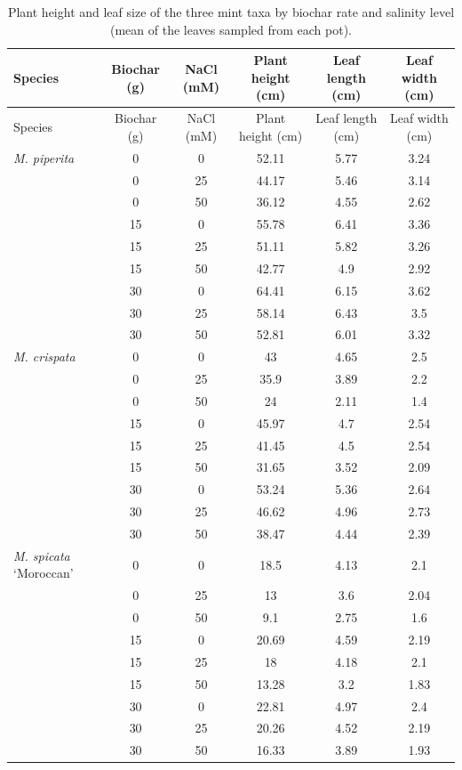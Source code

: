 {
\small
\begin{longtable}{p{3cm}cc S[table-format=2.2,round-mode=places,round-precision=2] S[table-format=1.2,round-mode=places,round-precision=2] S[table-format=1.2,round-mode=places,round-precision=2]}
  \caption[Plant height and leaf size]{Plant height and leaf size of the three mint taxa by biochar rate and salinity level (mean of the leaves sampled from each pot).} \label{tab:growth} \\
  \toprule
  Species & Biochar (g) & NaCl (mM) & {Plant height (cm)} & {Leaf length (cm)} & {Leaf width (cm)} \\
  \midrule
  \endfirsthead
  \toprule
  Species & Biochar (g) & NaCl (mM) & {Plant height (cm)} & {Leaf length (cm)} & {Leaf width (cm)} \\
  \midrule
  \endhead
  \bottomrule
  \endlastfoot
  \textit{M. piperita} & 0 & 0 & 52.11 & 5.77 & 3.24 \\
   & 0 & 25 & 44.17 & 5.46 & 3.14 \\
   & 0 & 50 & 36.12 & 4.55 & 2.62 \\
   & 15 & 0 & 55.78 & 6.41 & 3.36 \\
   & 15 & 25 & 51.11 & 5.82 & 3.26 \\
   & 15 & 50 & 42.77 & 4.9 & 2.92 \\
   & 30 & 0 & 64.41 & 6.15 & 3.62 \\
   & 30 & 25 & 58.14 & 6.43 & 3.5 \\
   & 30 & 50 & 52.81 & 6.01 & 3.32 \\
  \midrule
  \textit{M. crispata} & 0 & 0 & 43 & 4.65 & 2.5 \\
   & 0 & 25 & 35.9 & 3.89 & 2.2 \\
   & 0 & 50 & 24 & 2.11 & 1.4 \\
   & 15 & 0 & 45.97 & 4.7 & 2.54 \\
   & 15 & 25 & 41.45 & 4.5 & 2.54 \\
   & 15 & 50 & 31.65 & 3.52 & 2.09 \\
   & 30 & 0 & 53.24 & 5.36 & 2.64 \\
   & 30 & 25 & 46.62 & 4.96 & 2.73 \\
   & 30 & 50 & 38.47 & 4.44 & 2.39 \\
  \midrule
  \textit{M. spicata} `Moroccan' & 0 & 0 & 18.5 & 4.13 & 2.1 \\
   & 0 & 25 & 13 & 3.6 & 2.04 \\
   & 0 & 50 & 9.1 & 2.75 & 1.6 \\
   & 15 & 0 & 20.69 & 4.59 & 2.19 \\
   & 15 & 25 & 18 & 4.18 & 2.1 \\
   & 15 & 50 & 13.28 & 3.2 & 1.83 \\
   & 30 & 0 & 22.81 & 4.97 & 2.4 \\
   & 30 & 25 & 20.26 & 4.52 & 2.19 \\
   & 30 & 50 & 16.33 & 3.89 & 1.93 \\
\end{longtable}
}

